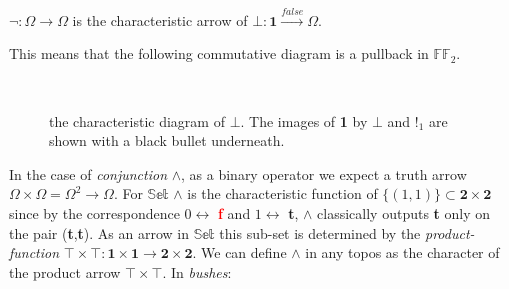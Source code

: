 \begin{definition}[$\neg$]
	$\neg : \Omega \rightarrow \Omega$ is the characteristic arrow of $\bot : \textbf{1} \xrightarrow{false} \Omega$.
\end{definition}

This means that the following commutative diagram is a pullback in $\mathbb{FF}_2$.

\begin{figure}[h]
	\centering 
	\
	\caption{the characteristic diagram of $\bot$. The images of \textbf{1} by $\bot$ and $!_1$ are shown with a black bullet underneath. }
\end{figure}   
\newpage
In the case of \emph{conjunction} $\land$, as a binary operator we expect a truth arrow $\Omega \times \Omega = \Omega^2 \rightarrow \Omega$. 
\newline
For $\mathbb{Set}$ $\land$ is the characteristic function of $\{ (1,1) \} \subset \textbf{2}\times\textbf{2}$ since by the correspondence $0 \leftrightarrow $ \textcolor{red}{\textbf{f}} and $1 \leftrightarrow $ \textcolor{OliveGreen}{\textbf{t}}, $\land$ classically outputs \textcolor{OliveGreen}{\textbf{t}} only on the pair (\textcolor{OliveGreen}{\textbf{t}},\textcolor{OliveGreen}{\textbf{t}}). As an arrow in $\mathbb{Set}$ this sub-set is determined by the \emph{product-function} $\top \times \top : \textbf{1} \times \textbf{1} \rightarrow \textbf{2} \times \textbf{2}$. \newline
We can define $\land$ in any topos as the character of the product arrow $\top \times \top$.\newline
In \emph{bushes}:

